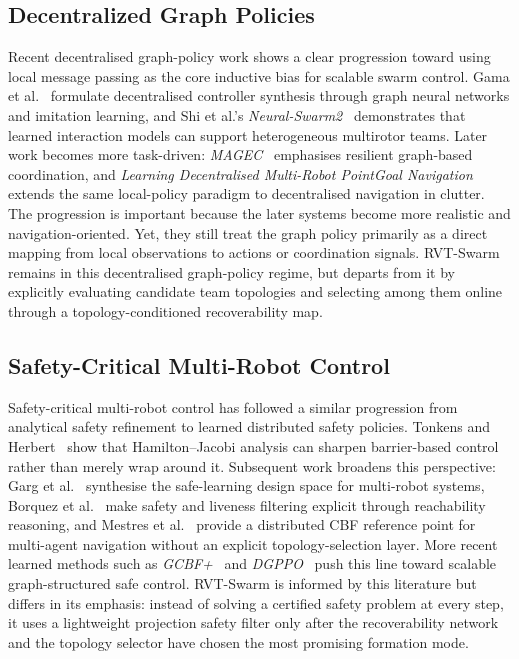 \documentclass{ieeeaccess}
\begin{document}
\subsection{Decentralized Graph Policies}
Recent decentralised graph-policy work shows a clear progression toward using local message passing as the core inductive bias for scalable swarm control. Gama et al.~\cite{gama2022gnn_synthesis} formulate decentralised controller synthesis through graph neural networks and imitation learning, and Shi et al.'s \emph{Neural-Swarm2}~\cite{shi2022neural_swarm2} demonstrates that learned interaction models can support heterogeneous multirotor teams. Later work becomes more task-driven: \emph{MAGEC}~\cite{goeckner2024magec} emphasises resilient graph-based coordination, and \emph{Learning Decentralised Multi-Robot PointGoal Navigation}~\cite{soualhi2025pointgoal} extends the same local-policy paradigm to decentralised navigation in clutter. The progression is important because the later systems become more realistic and navigation-oriented. Yet, they still treat the graph policy primarily as a direct mapping from local observations to actions or coordination signals. RVT-Swarm remains in this decentralised graph-policy regime, but departs from it by explicitly evaluating candidate team topologies and selecting among them online through a topology-conditioned recoverability map.

\subsection{Safety-Critical Multi-Robot Control}
Safety-critical multi-robot control has followed a similar progression from analytical safety refinement to learned distributed safety policies. Tonkens and Herbert~\cite{tonkens2022refining_cbf_hj} show that Hamilton--Jacobi analysis can sharpen barrier-based control rather than merely wrap around it. Subsequent work broadens this perspective: Garg et al.~\cite{garg2024safe_multirobot_review} synthesise the safe-learning design space for multi-robot systems, Borquez et al.~\cite{borquez2024hj_filtering} make safety and liveness filtering explicit through reachability reasoning, and Mestres et al.~\cite{mestres2024distributed_safe_navigation} provide a distributed CBF reference point for multi-agent navigation without an explicit topology-selection layer. More recent learned methods such as \emph{GCBF+}~\cite{zhang2025gcbf_plus} and \emph{DGPPO}~\cite{zhang2025dgppo} push this line toward scalable graph-structured safe control. RVT-Swarm is informed by this literature but differs in its emphasis: instead of solving a certified safety problem at every step, it uses a lightweight projection safety filter only after the recoverability network and the topology selector have chosen the most promising formation mode.
\end{document}
